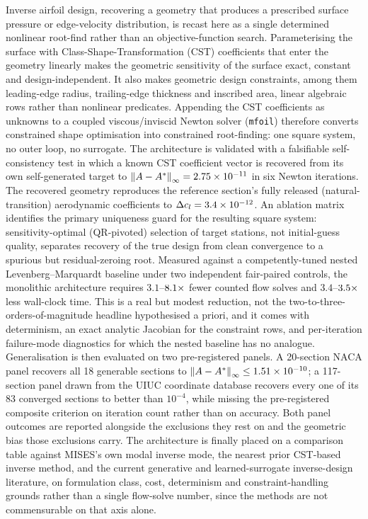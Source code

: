 Inverse airfoil design, recovering a geometry that produces a prescribed
surface pressure or edge-velocity distribution, is recast here as a single
determined nonlinear root-find rather than an objective-function search.
Parameterising the surface with Class-Shape-Transformation (CST) coefficients
that enter the geometry linearly makes the geometric sensitivity of the
surface exact, constant and design-independent. It also makes geometric
design constraints, among them leading-edge radius, trailing-edge thickness
and inscribed area, linear algebraic rows rather than nonlinear predicates.
Appending the CST coefficients as unknowns to a coupled viscous/inviscid
Newton solver (\texttt{mfoil}) therefore converts constrained shape
optimisation into constrained root-finding: one square system, no outer loop,
no surrogate. The architecture is validated with a falsifiable
self-consistency test in which a known CST coefficient vector is recovered
from its own self-generated target to
$\left\|A-A^\ast\right\|_\infty = 2.75\times10^{-11}$ in six Newton iterations. The
recovered geometry reproduces the reference section's fully released
(natural-transition) aerodynamic coefficients to
$\Delta c_l = 3.4\times10^{-12}$. An ablation matrix identifies the primary
uniqueness guard for the resulting square system: sensitivity-optimal
(QR-pivoted) selection of target stations, not initial-guess quality,
separates recovery of the true design from clean convergence to a spurious
but residual-zeroing root. Measured against a competently-tuned nested
Levenberg--Marquardt baseline under two independent fair-paired controls, the
monolithic architecture requires $3.1$--$8.1\times$ fewer counted flow solves and
$3.4$--$3.5\times$ less wall-clock time. This is a real but modest reduction, not
the two-to-three-orders-of-magnitude headline hypothesised a priori, and it
comes with determinism, an exact analytic Jacobian for the constraint rows,
and per-iteration failure-mode diagnostics for which the nested baseline has
no analogue. Generalisation is then evaluated on two pre-registered panels. A
20-section NACA panel recovers all 18 generable sections to
$\left\|A-A^\ast\right\|_\infty\leq1.51\times10^{-10}$; a 117-section panel drawn from
the UIUC coordinate database recovers every one of its 83 converged sections
to better than $10^{-4}$, while missing the pre-registered composite
criterion on iteration count rather than on accuracy. Both panel outcomes are
reported alongside the exclusions they rest on and the geometric bias those
exclusions carry. The architecture is finally placed on a comparison table
against MISES's own modal inverse mode, the nearest prior CST-based inverse
method, and the current generative and learned-surrogate inverse-design
literature, on formulation class, cost, determinism and constraint-handling
grounds rather than a single flow-solve number, since the methods are not
commensurable on that axis alone.
